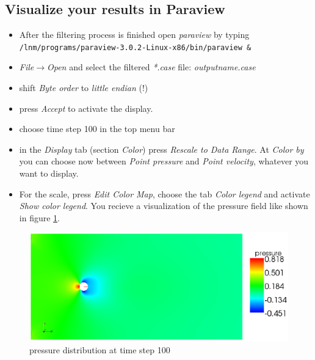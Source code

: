 \subsection{Visualize your results in Paraview}
\begin{itemize}
\item After the filtering process is finished open \emph{paraview} by typing \newline
\texttt{/lnm/programs/paraview-3.0.2-Linux-x86/bin/paraview \&}
\item \emph{File$\to$Open} and select the filtered \emph{*.case}
file: \emph{outputname.case}
\item shift \emph{Byte order} to \emph{little endian} (!) 
\item press \emph{Accept} to activate the display.
\item choose time step 100 in the top menu bar 
\item in the \emph{Display} tab (section \emph{Color}) press \emph{Rescale to Data Range}. At \emph{Color by} you can choose now
between \emph{Point pressure} and \emph{Point velocity}, whatever
you want to display.
\item For the scale, press \emph{Edit Color Map}, choose the tab \emph{Color legend} and activate \emph{Show color legend}.
You recieve a visualization of the pressure field like shown in figure \ref{fig:tut_fluid_mesh}.
\end{itemize}
\begin{figure}[h]
\begin{center}
 \includegraphics[scale=0.7]{pics/tut_fluid_pres}
 \caption{pressure distribution at time step 100}
\label{fig:tut_fluid_mesh}
\end{center}
\end{figure}
